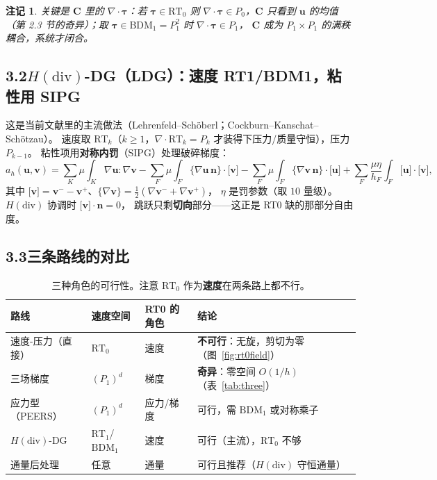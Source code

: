 \documentclass[UTF8,11pt,a4paper]{ctexart}
\theoremstyle{wjplain}
\theoremstyle{wjdef}
\newtheorem*{remark}{注记}
\newcommand{\bn}{\boldsymbol n}
\newcommand{\bu}{\boldsymbol u}
\newcommand{\bv}{\boldsymbol v}
\newcommand{\bC}{\boldsymbol C}
\newcommand{\bT}{\boldsymbol\tau}
\newcommand{\grad}{\nabla}
\newcommand{\dive}{\nabla\cdot}
\newcommand{\avg}[1]{\bigl\{#1\bigr\}}
\newcommand{\jump}[1]{\bigl[#1\bigr]}
\newcommand{\RT}{\mathrm{RT}}
\begin{document}
\begin{remark}
关键是 $\bC$ 里的 $\dive\bT$：若 $\bT\in\RT_0$ 则 $\dive\bT\in P_0$，$\bC$ 只看到
$\bu$ 的均值（第 2.3 节的奇异）；取 $\bT\in\mathrm{BDM}_1=P_1^2$ 时 $\dive\bT\in P_1$，
$\bC$ 成为 $P_1\times P_1$ 的满秩耦合，系统才闭合。
\end{remark}

\subsection*{3.2\quad $H(\mathrm{div})$-DG（LDG）：速度 RT1/BDM1，粘性用 SIPG}

这是当前文献里的主流做法（Lehrenfeld--Schöberl；Cockburn--Kanschat--Schötzau）。
速度取 $\RT_k$（$k\ge1$，$\dive\RT_k=P_k$ 才装得下压力/质量守恒），压力 $P_{k-1}$。
粘性项用\textbf{对称内罚}（SIPG）处理破碎梯度：
\begin{equation}\tag{3.6}
  a_h(\bu,\bv)=\sum_K\mu\!\!\int_K\!\grad\bu:\grad\bv
  -\sum_F\mu\!\!\int_F\!\avg{\grad\bu\,\bn}\cdot\jump{\bv}
  -\sum_F\mu\!\!\int_F\!\avg{\grad\bv\,\bn}\cdot\jump{\bu}
  +\sum_F\frac{\mu\eta}{h_F}\!\!\int_F\!\jump{\bu}\cdot\jump{\bv},
\end{equation}
其中 $\jump{\bv}=\bv^--\bv^+$、$\avg{\grad\bv}=\tfrac12(\grad\bv^-+\grad\bv^+)$，
$\eta$ 是罚参数（取 $10$ 量级）。$H(\mathrm{div})$ 协调时 $\jump{\bv}\cdot\bn=0$，
跳跃只剩\textbf{切向}部分——这正是 RT0 缺的那部分自由度。

\subsection*{3.3\quad 三条路线的对比}

\begin{table}[H]
\centering\small
\begin{tabularx}{\textwidth}{@{}l l l X@{}}
\toprule
路线 & 速度空间 & RT0 的角色 & 结论 \\
\midrule
速度-压力（直接） & $\RT_0$ & 速度 & \textbf{不可行}：无旋，剪切为零（图~\ref{fig:rt0field}） \\
三场梯度 & $(P_1)^d$ & 梯度 & \textbf{奇异}：零空间 $O(1/h)$（表~\ref{tab:three}）\\
应力型（PEERS） & $(P_1)^d$ & 应力/梯度 & 可行，需 $\mathrm{BDM}_1$ 或对称乘子 \\
$H(\mathrm{div})$-DG & $\RT_1$/$\mathrm{BDM}_1$ & 速度 & 可行（主流），$\RT_0$ 不够 \\
通量后处理 & 任意 & 通量 & 可行且推荐（$H(\mathrm{div})$ 守恒通量） \\
\bottomrule
\end{tabularx}
\caption{三种角色的可行性。注意 $\RT_0$ 作为\textbf{速度}在两条路上都不行。}
\label{tab:compare}
\end{table}
\end{document}
